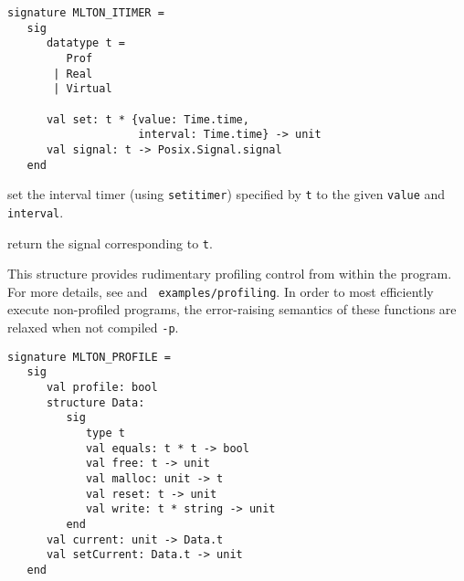 
\begin{verbatim}
signature MLTON_ITIMER =
   sig
      datatype t =
         Prof
       | Real
       | Virtual

      val set: t * {value: Time.time,
                    interval: Time.time} -> unit
      val signal: t -> Posix.Signal.signal
   end
\end{verbatim}

\begin{description}
set the interval timer (using {\tt setitimer}) specified by {\tt t} to the given
{\tt value} and {\tt interval}.

return the signal corresponding to {\tt t}.
\end{description}

This structure provides rudimentary profiling control from within the
program.  For more details, see  and {\tt
  examples/profiling}.  In order to most efficiently execute
non-profiled programs, the error-raising semantics of these functions
are relaxed when not compiled {\tt -p}.

\begin{verbatim}
signature MLTON_PROFILE =
   sig
      val profile: bool
      structure Data:
         sig
            type t
            val equals: t * t -> bool
            val free: t -> unit
            val malloc: unit -> t
            val reset: t -> unit
            val write: t * string -> unit
         end
      val current: unit -> Data.t
      val setCurrent: Data.t -> unit
   end
\end{verbatim}

